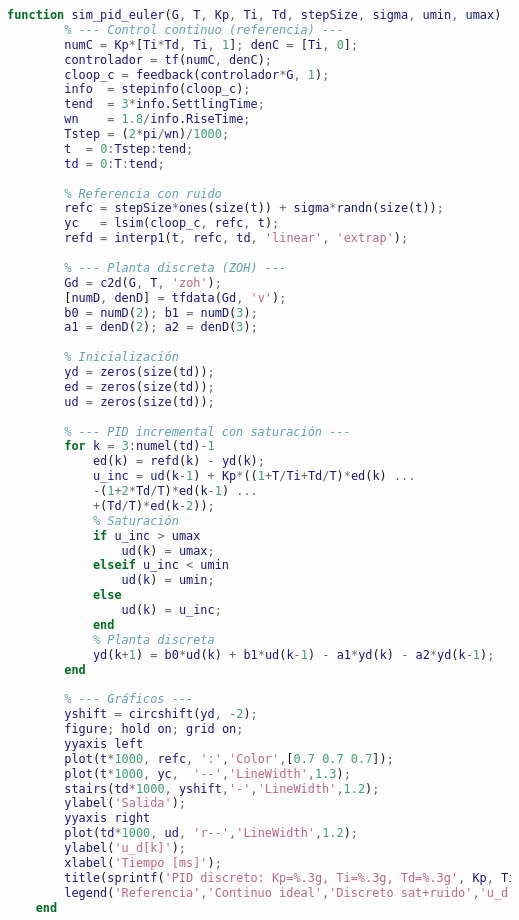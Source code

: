 \begin{strip}
	\vspace{-\baselineskip} %
	\noindent
	\begin{minipage}{0.98\textwidth}
		
\begin{lstlisting}[language=Matlab,style=matlabstyle, caption={función para la simulación del PID discreto con saturación y ruido.}, label={lst:pid_sat_noise}]
	function sim_pid_euler(G, T, Kp, Ti, Td, stepSize, sigma, umin, umax)
		% --- Control continuo (referencia) ---
		numC = Kp*[Ti*Td, Ti, 1]; denC = [Ti, 0];
		controlador = tf(numC, denC);
		cloop_c = feedback(controlador*G, 1);
		info  = stepinfo(cloop_c);
		tend  = 3*info.SettlingTime;
		wn    = 1.8/info.RiseTime;
		Tstep = (2*pi/wn)/1000;
		t  = 0:Tstep:tend;
		td = 0:T:tend;
		
		% Referencia con ruido
		refc = stepSize*ones(size(t)) + sigma*randn(size(t));
		yc   = lsim(cloop_c, refc, t);
		refd = interp1(t, refc, td, 'linear', 'extrap');
		
		% --- Planta discreta (ZOH) ---
		Gd = c2d(G, T, 'zoh');
		[numD, denD] = tfdata(Gd, 'v');
		b0 = numD(2); b1 = numD(3);
		a1 = denD(2); a2 = denD(3);
		
		% Inicialización
		yd = zeros(size(td));
		ed = zeros(size(td));
		ud = zeros(size(td));
		
		% --- PID incremental con saturación ---
		for k = 3:numel(td)-1
			ed(k) = refd(k) - yd(k);
			u_inc = ud(k-1) + Kp*((1+T/Ti+Td/T)*ed(k) ...
			-(1+2*Td/T)*ed(k-1) ...
			+(Td/T)*ed(k-2));
			% Saturación
			if u_inc > umax
				ud(k) = umax;
			elseif u_inc < umin
				ud(k) = umin;
			else
				ud(k) = u_inc;
			end
			% Planta discreta
			yd(k+1) = b0*ud(k) + b1*ud(k-1) - a1*yd(k) - a2*yd(k-1);
		end
		
		% --- Gráficos ---
		yshift = circshift(yd, -2);
		figure; hold on; grid on;
		yyaxis left
		plot(t*1000, refc, ':','Color',[0.7 0.7 0.7]);
		plot(t*1000, yc,  '--','LineWidth',1.3);
		stairs(td*1000, yshift,'-','LineWidth',1.2);
		ylabel('Salida');
		yyaxis right
		plot(td*1000, ud, 'r--','LineWidth',1.2);
		ylabel('u_d[k]');
		xlabel('Tiempo [ms]');
		title(sprintf('PID discreto: Kp=%.3g, Ti=%.3g, Td=%.3g', Kp, Ti, Td));
		legend('Referencia','Continuo ideal','Discreto sat+ruido','u_d');
	end
\end{lstlisting}
\end{minipage}
\vspace{-\baselineskip} %
\end{strip}
\clearpage
\newpage
\balance

